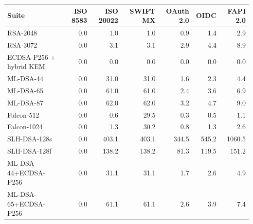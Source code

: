 \begin{tabular}{@{}lrrrrrr@{}}
\toprule
Suite & ISO 8583 & ISO 20022 & SWIFT MX & OAuth 2.0 & OIDC & FAPI 2.0 \\
\midrule
RSA-2048 & 0.0 & 1.0 & 1.0 & 0.9 & 1.4 & 2.9 \\
RSA-3072 & 0.0 & 3.1 & 3.1 & 2.9 & 4.4 & 8.9 \\
ECDSA-P256 + hybrid KEM & 0.0 & 0.0 & 0.0 & 0.0 & 0.0 & 0.0 \\
ML-DSA-44 & 0.0 & 31.0 & 31.0 & 1.6 & 2.3 & 4.4 \\
ML-DSA-65 & 0.0 & 61.0 & 61.0 & 2.4 & 3.6 & 6.9 \\
ML-DSA-87 & 0.0 & 62.0 & 62.0 & 3.2 & 4.7 & 9.0 \\
Falcon-512 & 0.0 & 0.6 & 29.5 & 0.3 & 0.5 & 1.1 \\
Falcon-1024 & 0.0 & 1.3 & 30.2 & 0.8 & 1.3 & 2.6 \\
SLH-DSA-128s & 0.0 & 403.1 & 403.1 & 344.5 & 545.2 & 1060.5 \\
SLH-DSA-128f & 0.0 & 138.2 & 138.2 & 81.3 & 119.5 & 151.2 \\
ML-DSA-44+ECDSA-P256 & 0.0 & 31.1 & 31.1 & 1.7 & 2.6 & 4.9 \\
ML-DSA-65+ECDSA-P256 & 0.0 & 61.1 & 61.1 & 2.6 & 3.9 & 7.4 \\
\bottomrule
\end{tabular}
